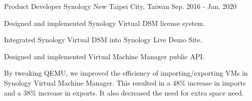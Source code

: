 \begin{cventries}
  \cventry
    {Product Developer} %
    {Synology} %
    {New Taipei City, Taiwan} %
    {Sep. 2016 - Jan. 2020} %
    {
      \begin{cvitems} %
        \item {Designed and implemented Synology Virtual DSM license system.}
        \item {Integrated Synology Virtual DSM into Synology Live Demo Site.}
        \item {Designed and implemented Virtual Machine Manager public API.}
        \item {By tweaking QEMU, we improved the efficiency of importing/exporting VMs in Synology Virtual Machine Manager. This resulted in a 48\% increase in imports and a 38\% increase in exports. It also decreased the need for extra space need.}
      \end{cvitems}
    }
\end{cventries}
